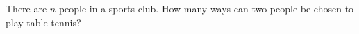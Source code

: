 There are $n$ people in a sports club. How many ways can two people be chosen to play table tennis?
